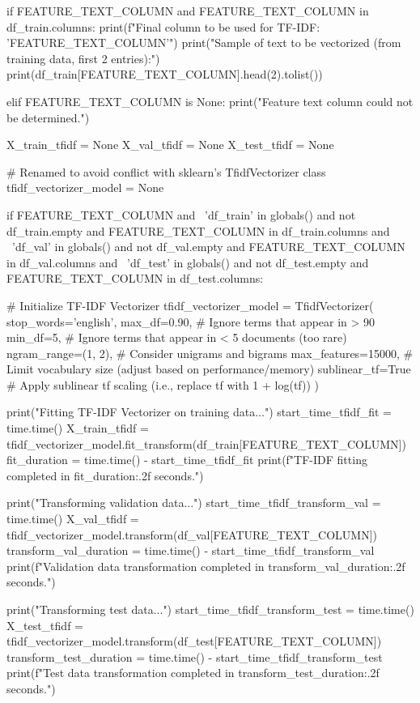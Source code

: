\begin{ffcode}
    if FEATURE_TEXT_COLUMN and FEATURE_TEXT_COLUMN in df_train.columns:
        print(f"Final column to be used for TF-IDF: '{FEATURE_TEXT_COLUMN}'")
        print("Sample of text to be vectorized (from training data, first 2 entries):")
        print(df_train[FEATURE_TEXT_COLUMN].head(2).tolist())

    elif FEATURE_TEXT_COLUMN is None:
            print("Feature text column could not be determined.")

X_train_tfidf = None
X_val_tfidf = None
X_test_tfidf = None

# Renamed to avoid conflict with sklearn's TfidfVectorizer class
tfidf_vectorizer_model = None

if FEATURE_TEXT_COLUMN and \
    'df_train' in globals() and not df_train.empty and FEATURE_TEXT_COLUMN in df_train.columns and \
    'df_val' in globals() and not df_val.empty and FEATURE_TEXT_COLUMN in df_val.columns and \
    'df_test' in globals() and not df_test.empty and FEATURE_TEXT_COLUMN in df_test.columns:

    # Initialize TF-IDF Vectorizer
    tfidf_vectorizer_model = TfidfVectorizer(
        stop_words='english',
        max_df=0.90,        # Ignore terms that appear in > 90%
        min_df=5,           # Ignore terms that appear in < 5 documents (too rare)
        ngram_range=(1, 2), # Consider unigrams and bigrams
        max_features=15000, # Limit vocabulary size (adjust based on performance/memory)
        sublinear_tf=True   # Apply sublinear tf scaling (i.e., replace tf with 1 + log(tf))
    )

    print("Fitting TF-IDF Vectorizer on training data...")
    start_time_tfidf_fit = time.time()
    X_train_tfidf = tfidf_vectorizer_model.fit_transform(df_train[FEATURE_TEXT_COLUMN])
    fit_duration = time.time() - start_time_tfidf_fit
    print(f"TF-IDF fitting completed in {fit_duration:.2f} seconds.")

    print("Transforming validation data...")
    start_time_tfidf_transform_val = time.time()
    X_val_tfidf = tfidf_vectorizer_model.transform(df_val[FEATURE_TEXT_COLUMN])
    transform_val_duration = time.time() - start_time_tfidf_transform_val
    print(f"Validation data transformation completed in {transform_val_duration:.2f} seconds.")

    print("Transforming test data...")
    start_time_tfidf_transform_test = time.time()
    X_test_tfidf = tfidf_vectorizer_model.transform(df_test[FEATURE_TEXT_COLUMN])
    transform_test_duration = time.time() - start_time_tfidf_transform_test
    print(f"Test data transformation completed in {transform_test_duration:.2f} seconds.")


\end{ffcode}
